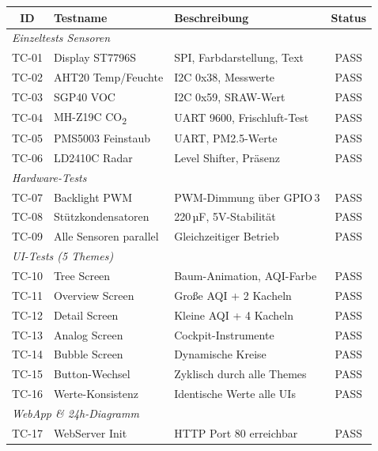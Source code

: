 \documentclass[a4paper,11pt]{article}
\begin{document}
\begin{longtable}{c p{5cm} p{5cm} c}
\toprule
\rowcolor{tableheader}
\textbf{ID} & \textbf{Testname} & \textbf{Beschreibung} & \textbf{Status} \\
\midrule
\endhead
\multicolumn{4}{l}{\textit{Einzeltests Sensoren}} \\
\midrule
TC-01 & Display ST7796S & SPI, Farbdarstellung, Text & \textcolor{pass}{PASS} \\
TC-02 & AHT20 Temp/Feuchte & I2C 0x38, Messwerte & \textcolor{pass}{PASS} \\
TC-03 & SGP40 VOC & I2C 0x59, SRAW-Wert & \textcolor{pass}{PASS} \\
TC-04 & MH-Z19C CO\textsubscript{2} & UART 9600, Frischluft-Test & \textcolor{pass}{PASS} \\
TC-05 & PMS5003 Feinstaub & UART, PM2.5-Werte & \textcolor{pass}{PASS} \\
TC-06 & LD2410C Radar & Level Shifter, Präsenz & \textcolor{pass}{PASS} \\
\midrule
\multicolumn{4}{l}{\textit{Hardware-Tests}} \\
\midrule
TC-07 & Backlight PWM & PWM-Dimmung über GPIO\,3 & \textcolor{pass}{PASS} \\
TC-08 & Stützkondensatoren & 220\,µF, 5V-Stabilität & \textcolor{pass}{PASS} \\
TC-09 & Alle Sensoren parallel & Gleichzeitiger Betrieb & \textcolor{pass}{PASS} \\
\midrule
\multicolumn{4}{l}{\textit{UI-Tests (5 Themes)}} \\
\midrule
TC-10 & Tree Screen & Baum-Animation, AQI-Farbe & \textcolor{pass}{PASS} \\
TC-11 & Overview Screen & Große AQI + 2 Kacheln & \textcolor{pass}{PASS} \\
TC-12 & Detail Screen & Kleine AQI + 4 Kacheln & \textcolor{pass}{PASS} \\
TC-13 & Analog Screen & Cockpit-Instrumente & \textcolor{pass}{PASS} \\
TC-14 & Bubble Screen & Dynamische Kreise & \textcolor{pass}{PASS} \\
TC-15 & Button-Wechsel & Zyklisch durch alle Themes & \textcolor{pass}{PASS} \\
TC-16 & Werte-Konsistenz & Identische Werte alle UIs & \textcolor{pass}{PASS} \\
\midrule
\multicolumn{4}{l}{\textit{WebApp \& 24h-Diagramm}} \\
\midrule
TC-17 & WebServer Init & HTTP Port 80 erreichbar & \textcolor{pass}{PASS} \\

\end{longtable}
\end{document}
